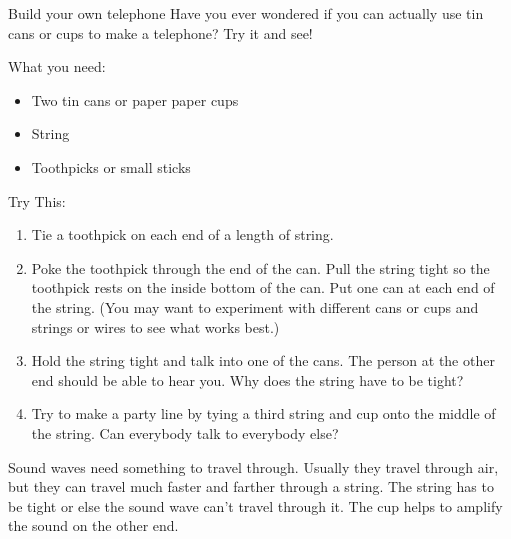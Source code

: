 	\par


\begin{activity}{Build your own telephone} 
Have you ever wondered if you can actually use tin cans or cups to make a telephone? Try it and see!

What you need:
\begin{itemize}
 \item Two tin cans or paper paper cups
  \item String
  \item Toothpicks or small sticks
\end{itemize}

Try This:
\begin{enumerate}[noitemsep, label=\textbf{\arabic*}. ] 
\item Tie a toothpick on each end of a length of string.
\item Poke the toothpick through the end of the can. Pull the string tight so the toothpick rests on the inside bottom of the can. Put one can at each end of the string. (You may want to experiment with different cans or cups and strings or wires to see what works best.)
\item Hold the string tight and talk into one of the cans. The person at the other end should be able to hear you. Why does the string have to be tight?
\item Try to make a party line by tying a third string and cup onto the middle of the string. Can everybody talk to everybody else?
\end{enumerate}

Sound waves need something to travel through. Usually they travel through air, but they can travel much faster and farther through a string. The string has to be tight or else the sound wave can’t travel through it. The cup helps to amplify the sound on the other end. 
\end{activity}

    \label{m38799*cid3}
